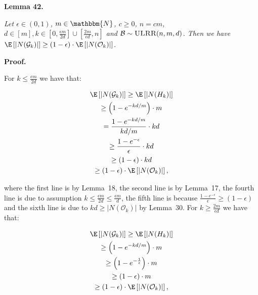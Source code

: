 \par\medskip\noindent\textbf{\textbf{Lemma 42}\textbf{.}}\par



\emph{Let $\epsilon\in(0,1)$, $m\in\mathbbm{N}$, $c\geq 0$, $n=cm$, $d\in[m],k\in\left[0,\frac{\epsilon m}{2d}\right]\cup\left[\frac{2m}{\epsilon d},n\right]$ and $\mathcal{B}\sim\textsc{ULRR}(n,m,d)$.
Then we have $\E\left[|N(\mathcal{G}_{k})|\right]\geq\left(1-\epsilon\right)\cdot\E\left[|N(\mathcal{O}_{k})|\right]$.}\par






\par\medskip\noindent\textbf{Proof.}\par



For $k\leq\frac{\epsilon m}{2d}$ we have that:\par


\[\begin{gathered}
\displaystyle\E\left[|N(\mathcal{G}_{k})|\right] \displaystyle\geq\E\left[|N(H_{k})|\right] \\
\displaystyle\geq\left(1-e^{-kd/m}\right)\cdot m \\
\displaystyle=\frac{1-e^{-kd/m}}{kd/m}\cdot kd \\
\displaystyle\geq\frac{1-e^{-\epsilon}}{\epsilon}\cdot kd \\
\displaystyle\geq\left(1-\epsilon\right)\cdot kd \\
\displaystyle\geq\left(1-\epsilon\right)\cdot\E\left[|N(\mathcal{O}_{k})|\right],
\end{gathered}\]


where the first line is by Lemma 18, the second line is by Lemma 17, the fourth line is due to assumption $k\leq\frac{\epsilon m}{2d}\leq\frac{\epsilon m}{d}$, the fifth line is because $\frac{1-e^{-\epsilon}}{\epsilon}\geq(1-\epsilon)$ and the sixth line is due to $kd\geq|N(\mathcal{O}_{k})|$ by Lemma 30.
For $k\geq\frac{2m}{\epsilon d}$ we have that:\par


\[\begin{gathered}
\displaystyle\E\left[|N(\mathcal{G}_{k})|\right] \displaystyle\geq\E\left[|N(H_{k})|\right] \\
\displaystyle\geq\left(1-e^{-kd/m}\right)\cdot m \\
\displaystyle\geq\left(1-e^{-\frac{1}{\epsilon}}\right)\cdot m \\
\displaystyle\geq\left(1-\epsilon\right)\cdot m \\
\displaystyle\geq\left(1-\epsilon\right)\cdot\E\left[|N(\mathcal{O}_{k})|\right],
\end{gathered}\]



